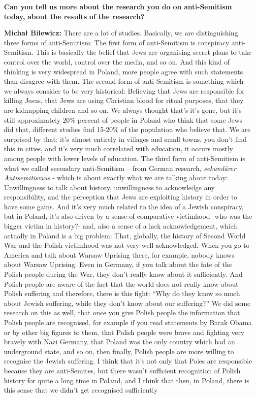 \textbf{Can you tell us more about the research you do on anti-Semitism today, about the results of the research?} 

\textbf{Michał Bilewicz:} There are a lot of studies. Basically, we are distinguishing three forms of anti-Semitism: The first form of anti-Semitism is conspiracy anti-Semitism. This is basically the belief that Jews are organising secret plans to take control over the world, control over the media, and so on. And this kind of thinking is very widespread in Poland, more people agree with such statements than disagree with them. The second form of anti-Semitism is something which we always consider to be very historical: Believing that Jews are responsible for killing Jesus, that Jews are using Christian blood for ritual purposes, that they are kidnapping children and so on. We always thought that’s it’s gone, but it’s still approximately 20\% percent of people in Poland who think that some Jews did that, different studies find 15-20\% of the population who believe that. We are surprised by that; it’s almost entirely in villages and small towns, you don’t find this in cities, and it’s very much correlated with education, it occurs mostly among people with lower levels of education. The third form of anti-Semitism is what we called secondary anti-Semitism – from German research, \textit{sekundärer Antisemitismus} - which is about exactly what we are talking about today: Unwillingness to talk about history, unwillingness to acknowledge any responsibility, and the perception that Jews are exploiting history in order to have some gains. And it’s very much related to the idea of a Jewish conspiracy, but in Poland, it's also driven by a sense of comparative victimhood- who was the bigger victim in history?- and, also a sense of a lack acknowledgement, which actually in Poland is a big problem: That, globally, the history of Second World War and the Polish victimhood was not very well acknowledged. When you go to America and talk about Warsaw Uprising there, for example, nobody knows about Warsaw Uprising. Even in Germany, if you talk about the fate of the Polish people during the War, they don’t really know about it sufficiently. And Polish people are aware of the fact that the world does not really know about Polish suffering and therefore, there is this fight: ``Why do they know so much about Jewish suffering, while they don’t know about our suffering?'' We did some research on this as well, that once you give Polish people the information that Polish people are recognised, for example if you read statements by Barak Obama or by other big figures to them, that Polish people were brave and fighting very bravely with Nazi Germany, that Poland was the only country which had an underground state, and so on, then finally, Polish people are more willing to recognise the Jewish suffering. I think that it's not only that Poles are responsible because they are anti-Semites, but there wasn't sufficient recognition of Polish history for quite a long time in Poland, and I think that then, in Poland, there is this sense that we didn’t get recognised sufficiently

